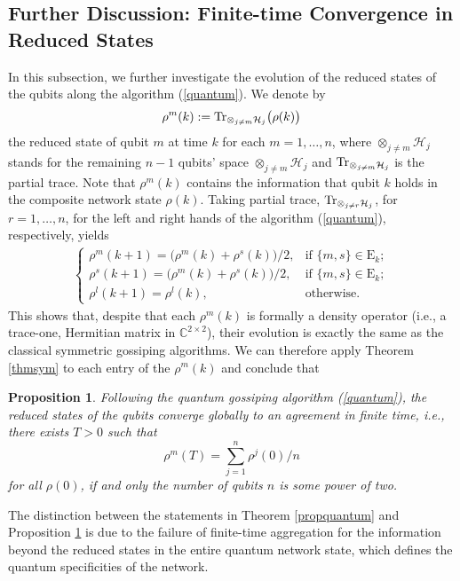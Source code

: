 \documentclass[a4paper, 11pt]{article}
\newtheorem{proposition}{Proposition}
\begin{document}
{
\subsection{Further Discussion: Finite-time Convergence in Reduced States}
In this subsection, we further investigate the evolution of the reduced states of the qubits along the algorithm (\ref{quantum}). We denote by $$
\rho^m(k):= {\rm Tr}_{\otimes_{j\neq m} \mathcal{H}_j } \big(\rho(k)\big)
$$
 the reduced state of qubit $m$  at time $k$ for each $m=1,\dots,n$, where $\otimes_{j\neq m} \mathcal{H}_j$ stands for the remaining  $n-1$ qubits' space $\otimes_{j\neq m} \mathcal{H}_j$ and ${\rm Tr}_{\otimes_{j\neq m} \mathcal{H}_j }$ is the partial trace. Note that $\rho^m(k)$ contains  the information that qubit $k$ holds in the composite network state $\rho(k)$. Taking partial trace, ${\rm Tr}_{\otimes_{j\neq r} \mathcal{H}_j }$, for $r=1,\dots,n$, for the left and right hands of the algorithm (\ref{quantum}), respectively,  yields
\begin{align} \begin{cases}
\rho^m(k+1) = \big(\rho^m(k)+ \rho^s(k)\big)/2,  & \mbox{if $\{m,s\}\in\mathrm{E}_k$};\\[2mm]
\rho^s(k+1) = \big(\rho^m(k)+ \rho^s(k)\big)/2,  & \mbox{if $\{m,s\}\in\mathrm{E}_k$};\\[2mm]
	\rho^l(k+1) = \rho^l(k), & \mbox{otherwise}.
\end{cases}
\end{align}
This shows that, despite that  each $	\rho^m(k)$ is formally a density operator (i.e., a trace-one,  Hermitian matrix in  $\mathbb{C}^{2\times 2}$), their evolution is exactly the same as the  classical symmetric gossiping algorithms. We can therefore apply Theorem \ref{thmsym} to each entry of the 	$\rho^m(k)$ and conclude that

\medskip

\begin{proposition}\label{propreduced}
Following the quantum gossiping algorithm (\ref{quantum}), the reduced states of the qubits  converge globally to an agreement in finite time, i.e., there exists $T>0$ such that
 $$
 \rho^m(T)=\sum_{j=1}^n \rho^j(0)/n
 $$
 for all $\rho(0)$, if and only the number of qubits $n$ is some power of two.
\end{proposition}

\medskip


The distinction between  the statements in Theorem \ref{propquantum} and Proposition \ref{propreduced} is due to the failure of finite-time aggregation for the information beyond the reduced states in the entire quantum network state, which defines      the quantum specificities of the network.
}
\end{document}
